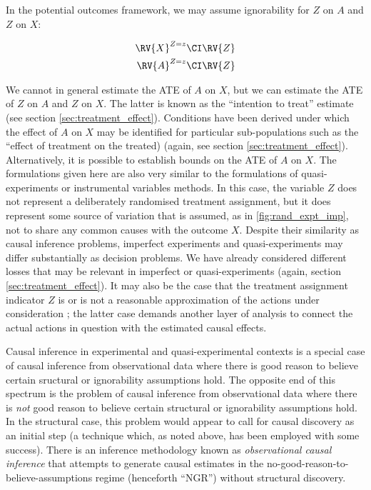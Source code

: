 In the potential outcomes framework, we may assume ignorability for $Z$ on $A$ and $Z$ on $X$:

\begin{align}
    \RV{X}^{Z=z} &\CI \RV{Z}\\
    \RV{A}^{Z=z} &\CI \RV{Z}
\end{align}

We cannot in general estimate the ATE of $A$ on $X$, but we can estimate the ATE of $Z$ on $A$ and $Z$ on $X$. The latter is known as the ``intention to treat'' estimate (see section \ref{sec:treatment_effect}). Conditions have been derived under which the effect of $A$ on $X$ may be identified for particular sub-populations such as the ``effect of treatment on the treated) (again, see section \ref{sec:treatment_effect})\cite{angrist_identification_1996,pearl_causality:_2009}. Alternatively, it is possible to establish bounds on the ATE of $A$ on $X$\cite{balke_bounds_1997}. The formulations given here are also very similar to the formulations of quasi-experiments or instrumental variables methods\cite{angrist_instrumental_2001}. In this case, the variable $Z$ does not represent a deliberately randomised treatment assignment, but it does represent some source of variation that is assumed, as in \ref{fig:rand_expt_imp}, not to share any common causes with the outcome $X$\cite{angrist_mastering_2014}. Despite their similarity as causal inference problems, imperfect experiments and quasi-experiments may differ substantially as decision problems. We have already considered different losses that may be relevant in imperfect or quasi-experiments (again, section \ref{sec:treatment_effect}). It may also be the case that the treatment assignment indicator $Z$ is or is not a reasonable approximation of the actions under consideration \cite{heckman_randomization_1991}; the latter case demands another layer of analysis to connect the actual actions in question with the estimated causal effects.


Causal inference in experimental and quasi-experimental contexts is a special case of causal inference from observational data where there is good reason to believe certain sructural or ignorability assumptions hold. The opposite end of this spectrum is the problem of causal inference from observational data where there is \emph{not} good reason to believe certain structural or ignorability assumptions hold. In the structural case, this problem would appear to call for causal discovery as an initial step (a technique which, as noted above, has been employed with some success). There is an inference methodology known as \emph{observational causal inference} that attempts to generate causal estimates in the no-good-reason-to-believe-assumptions regime (henceforth ``NGR'') without structural discovery.

